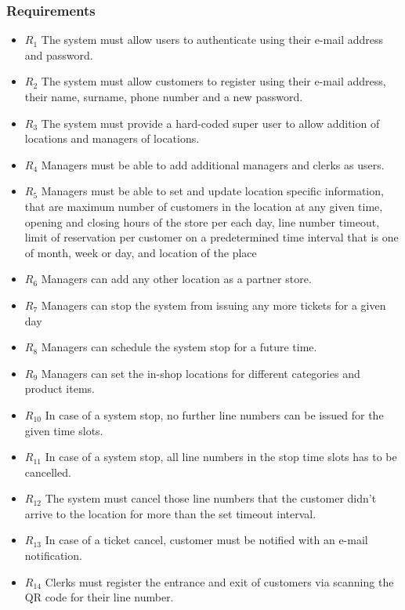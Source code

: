\subsubsection{Requirements}
\begin{itemize}
    \item \textbf{$R_1$} The system must allow users to authenticate using their e-mail address and password. %
    \item \textbf{$R_2$} The system must allow customers to register using their e-mail address, their name, surname, phone number and a new password.
    \item \textbf{$R_3$} The system must provide a hard-coded super user to allow addition of locations and managers of locations.
    \item \textbf{$R_4$} Managers must be able to add additional managers and clerks as users.
    \item \textbf{$R_5$} Managers must be able to set and update location specific information, that are maximum number of customers in the location at any given time, opening and closing hours of the store per each day, line number timeout, limit of reservation per customer on a predetermined time interval that is one of month, week or day, and location of the place %
    \item \textbf{$R_6$} Managers can add any other location as a partner store.
    \item \textbf{$R_7$} Managers can stop the system from issuing any more tickets for a given day
    \item \textbf{$R_8$} Managers can schedule the system stop for a future time.
    \item \textbf{$R_9$} Managers can set the in-shop locations for different categories and product items.
    \item \textbf{$R_{10}$} In case of a system stop, no further line numbers can be issued for the given time slots.
    \item \textbf{$R_{11}$} In case of a system stop, all line numbers in the stop time slots has to be cancelled.
    \item \textbf{$R_{12}$} The system must cancel those line numbers that the customer didn't arrive to the location for more than the set timeout interval.
    \item \textbf{$R_{13}$} In case of a ticket cancel, customer must be notified with an e-mail notification. %
    \item \textbf{$R_{14}$} Clerks must register the entrance and exit of customers via scanning the QR code for their line number.

\end{itemize}
